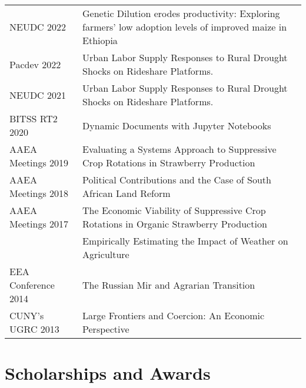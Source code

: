 \documentclass[
  11pt]{article}
\def\toprule{}
\def\bottomrule{}
\begin{document}
\begin{longtable}[]{@{}
  >{\raggedright\arraybackslash}p{}
  >{\raggedright\arraybackslash}p{}@{}}
\toprule
\endhead
NEUDC 2022 & Genetic Dilution erodes productivity: Exploring farmers'
low adoption levels of improved maize in Ethiopia \\
Pacdev 2022 & Urban Labor Supply Responses to Rural Drought Shocks on
Rideshare Platforms. \\
NEUDC 2021 & Urban Labor Supply Responses to Rural Drought Shocks on
Rideshare Platforms. \\
BITSS RT2 2020 & Dynamic Documents with Jupyter Notebooks \\
AAEA Meetings 2019 & Evaluating a Systems Approach to Suppressive Crop
Rotations in Strawberry Production \\
AAEA Meetings 2018 & Political Contributions and the Case of South
African Land Reform \\
AAEA Meetings 2017 & The Economic Viability of Suppressive Crop
Rotations in Organic Strawberry Production \\
& Empirically Estimating the Impact of Weather on Agriculture \\
EEA Conference 2014 & The Russian Mir and Agrarian Transition \\
CUNY's UGRC 2013 & Large Frontiers and Coercion: An Economic
Perspective \\
\bottomrule
\end{longtable}

\hypertarget{scholarships-and-awards}{%
\section{Scholarships and Awards}\label{scholarships-and-awards}}

\small
\end{document}
